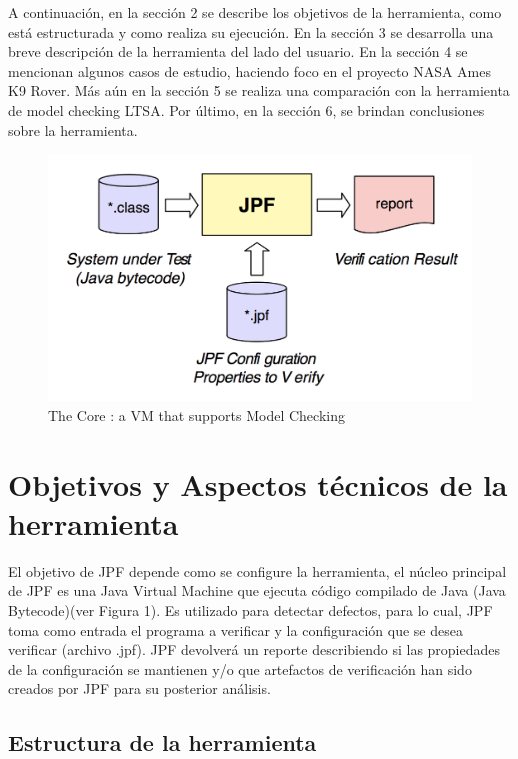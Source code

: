 \documentclass[runningheads]{llncs}
\begin{document}
A continuaci\'on, en la secci\'on 2 se describe los objetivos de la herramienta, como est\'a estructurada y como realiza su ejecuci\'on. En la secci\'on 3 se desarrolla una breve descripci\'on de la herramienta del lado del usuario. En la secci\'on 4 se mencionan algunos casos de estudio, haciendo foco en el proyecto NASA Ames K9 Rover. M\'as a\'un en la secci\'on 5 se realiza una comparaci\'on con la herramienta de model checking LTSA. Por \'ultimo, en la secci\'on 6, se brindan conclusiones sobre la herramienta.


\begin{figure}
\includegraphics[width=\textwidth]{fig1.png}
\caption{The Core : a VM that supports Model Checking} \label{fig1}
\end{figure}

\section{Objetivos y Aspectos t\'ecnicos de la herramienta}

El objetivo de JPF depende como se configure la herramienta, el n\'ucleo principal de JPF es una Java Virtual Machine que ejecuta c\'odigo compilado de Java (Java Bytecode)(ver Figura 1). Es utilizado para detectar defectos, para lo cual, JPF toma como entrada el programa a verificar y la configuraci\'on que se desea verificar (archivo .jpf). JPF devolver\'a un reporte describiendo si las propiedades de la configuraci\'on se mantienen y/o que artefactos de verificaci\'on han sido creados por JPF para su posterior an\'alisis. 

\subsection{Estructura de la herramienta}
\end{document}
